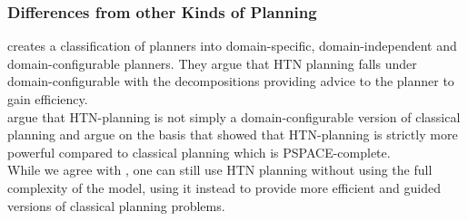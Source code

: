 \begin{comment}
\cite{erol1994htn}
- complexity depends on
	1. existence/ ordering of non-primitive tasks in task networks
	2. total order (or not) of tasks
	3. whether variables are allowed
- general HTN planning (non-primitive tasks are allowed, no guaranteed total order, variables are allowed) -> undecidable
- TOHTN planning (variables allowed, arbitrary non-primitive tasks) -> D-EXPTIME, EXPSPACE-hard
 
- context free grammars play a role, can be simulated in HTN

\cite{erol1996complexity}
- undecidable for HTN, D-EXPTIME and PSPACE-hard for TOHTN

both: context-free grammars can be simulated by HTN, use primitive tasks as terminals, abstract tasks as non-terminals, methods as grammar rules

\cite{holler2014language}
- TOHTN planning problems correspond to context free grammars

\cite{behnke2015complexity}
- HTN plan verification is NP-complete
- this even holds if the list of decompositions is provided
\end{comment}


\subsubsection{Differences from other Kinds of Planning}
\cite{nau2007current} creates a classification of planners into domain-specific, domain-independent and domain-configurable planners.
They argue that HTN planning falls under domain-configurable with the decompositions providing advice to the planner to gain efficiency. \\
\cite{holler2020htn} argue that HTN-planning is not simply a domain-configurable version of classical planning and argue on the basis that \cite{erol1994htn, erol1996complexity} showed that HTN-planning is strictly more powerful compared to classical planning which is PSPACE-complete. \\
While we agree with \cite{holler2020htn}, one can still use HTN planning without using the full complexity of the model, using it instead to provide more efficient and guided versions of classical planning problems.